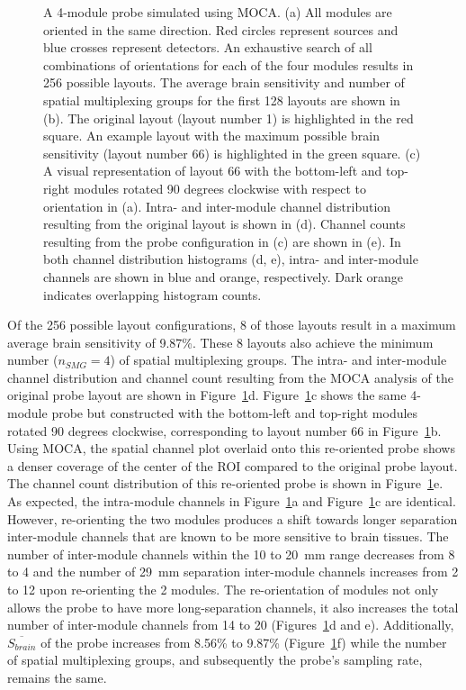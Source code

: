 \begin{figure}
\begin{center}
\end{center}
\caption{A 4-module probe simulated using MOCA. (a) All modules are oriented in the same direction. Red circles represent sources and blue crosses represent detectors. An exhaustive search of all combinations of orientations for each of the four modules results in 256 possible layouts. The average brain sensitivity and number of spatial multiplexing groups for the first 128 layouts are shown in (b). The original layout (layout number 1) is highlighted in the red square. An example layout with the maximum possible brain sensitivity (layout number 66) is highlighted in the green square. (c) A visual representation of layout 66 with the bottom-left and top-right modules rotated 90 degrees clockwise with respect to orientation in (a). Intra- and inter-module channel distribution resulting from the original layout is shown in (d). Channel counts resulting from the probe configuration in (c) are shown in (e). In both channel distribution histograms (d, e), intra- and inter-module channels are shown in blue and orange, respectively. Dark orange indicates overlapping histogram counts.} 
\label{fig:orientation}
\end{figure} 

Of the 256 possible layout configurations, 8 of those layouts result in a maximum average brain sensitivity of 9.87\%. These 8 layouts also achieve the minimum number ($n_{SMG}=4$) of spatial multiplexing groups. The intra- and inter-module channel distribution and channel count resulting from the \ac{MOCA} analysis of the original probe layout are shown in Figure~\ref{fig:orientation}d. Figure~\ref{fig:orientation}c shows the same 4-module probe but constructed with the bottom-left and top-right modules rotated 90 degrees clockwise, corresponding to layout number 66 in Figure~\ref{fig:orientation}b. Using \ac{MOCA}, the spatial channel plot overlaid onto this re-oriented probe shows a denser coverage of the center of the \ac{ROI} compared to the original probe layout. The channel count distribution of this re-oriented probe is shown in Figure~\ref{fig:orientation}e. As expected, the intra-module channels in Figure~\ref{fig:orientation}a and Figure~\ref{fig:orientation}c are identical. However, re-orienting the two modules produces a shift towards longer separation inter-module channels that are known to be more sensitive to brain tissues. The number of inter-module channels within the 10 to 20~mm range decreases from 8 to 4 and the number of 29~mm separation inter-module channels increases from 2 to 12 upon re-orienting the 2 modules. The re-orientation of modules not only allows the probe to have more long-separation channels, it also increases the total number of inter-module channels from 14 to 20 (Figures~\ref{fig:orientation}d and e). Additionally, $\overline{S_{brain}}$ of the probe increases from 8.56\% to 9.87\% (Figure~\ref{fig:orientation}f) while the number of spatial multiplexing groups, and subsequently the probe's sampling rate, remains the same.


